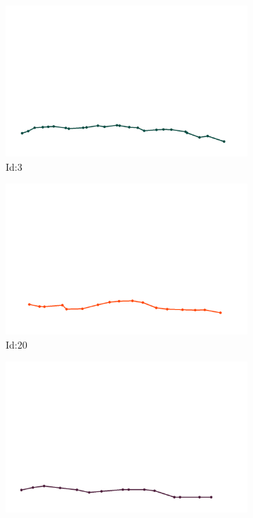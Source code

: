 \documentclass[12pt,twoside]{report}
\begin{document}
\begin{figure}
\centering
\begin{subfigure}[b]{0.20\textwidth}
\centering
\includegraphics[width=\textwidth]{../trajectories/3.png}
\caption{Id:3}
\end{subfigure}
\begin{subfigure}[b]{0.20\textwidth}
\centering
\includegraphics[width=\textwidth]{../trajectories/20.png}
\caption{Id:20}
\end{subfigure}
\begin{subfigure}[b]{0.20\textwidth}
\centering
\includegraphics[width=\textwidth]{../trajectories/22.png}

\end{subfigure}
\end{figure}
\end{document}
